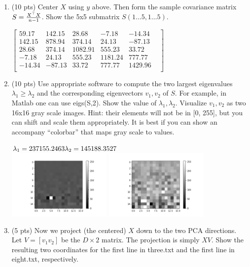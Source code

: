\documentclass[a4paper]{article}
\theoremstyle{definition}
\newenvironment{soln}{
    \leavevmode\color{blue}\ignorespaces
}{}
\begin{document}
\begin{enumerate}
\item (10 pts) Center $X$ using $y$ above.  Then form the sample covariance matrix $S={X^\top X \over n-1}$.
Show the 5x5 submatrix $S(1\ldots 5, 1 \ldots 5)$.
\begin{soln}
\begin{center}
$
\begin{bmatrix}	
59.17  & 142.15  & 28.68  & -7.18  & -14.34  & \\
142.15  & 878.94  & 374.14  & 24.13  & -87.13  & \\
28.68  & 374.14  & 1082.91  & 555.23  & 33.72  & \\
-7.18  & 24.13  & 555.23  & 1181.24  & 777.77  & \\
-14.34  & -87.13  & 33.72  & 777.77  & 1429.96  & \\
	\end{bmatrix}
$
\end{center}
\end{soln}

\item (10 pts) Use appropriate software to compute the two largest eigenvalues $\lambda_1 \ge \lambda_2$ and the corresponding eigenvectors $v_1, v_2$ of $S$.
For example, in Matlab one can use eigs(S,2).  
Show the value of $\lambda_1, \lambda_2$.
Visualize $v_1, v_2$ as two 16x16 gray scale images.
Hint: their elements will not be in [0, 255], but you can shift and scale them appropriately.  It is best if you can show an accompany ``colorbar'' that maps gray scale to values. 

\begin{soln}

 $\lambda_1 =237155.2463\\
 \lambda_2 = 145188.3527$\\
\includegraphics[width=0.4\textwidth]{eigenv1.png}
\includegraphics[width=0.4\textwidth]{eigenv2.png}
\end{soln}
\item (5 pts) Now we project (the centered) $X$ down to the two PCA directions.   Let $V=[v_1 v_2]$ be the $D\times 2$ matrix.  The projection is simply $XV$.
Show the resulting two coordinates for the first line in three.txt and the first line in eight.txt, respectively.


\end{enumerate}
\end{document}
